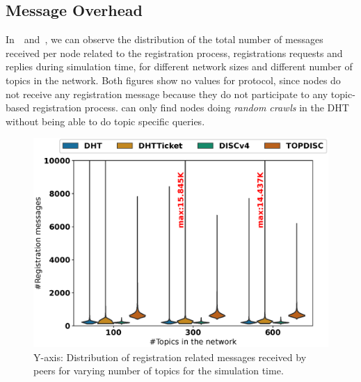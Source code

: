 \subsection{Message Overhead}


In~~and~,  we can observe the distribution of the total number of messages received per node related to the registration process, \ie registrations requests and replies during simulation time,  for different network sizes and different number of topics in the network.
Both figures show no values for \discv protocol,  since  \discv nodes do not receive any registration message because they do not participate to any topic-based registration process.   \discv can only find nodes doing  \emph{random crawls} in the DHT  without being able to do topic specific queries. 

\begin{figure}
\centering
\includegraphics[width=\linewidth]{results/efficiency/violin_topic_registrationMsgs.eps}
\caption{Y-axis: Distribution of registration related messages received by peers for varying number of topics for the simulation time.}
\label{fig:regMsgsPerTopic}
\end{figure}

